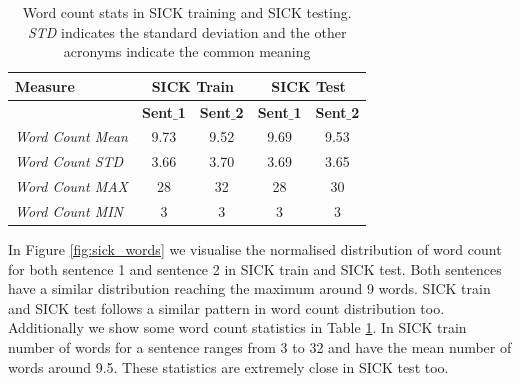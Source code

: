 \begin{enumerate}
\begin{table}
	\centering
	\begin{tabular}{l|cc|cc}
		\hline
		Measure   & \multicolumn{2}{c|}{SICK Train} & \multicolumn{2}{c}{SICK Test} \\
		\hline
		\multicolumn{1}{l|}{} & \textbf{Sent$\_$1} & \textbf{Sent$\_$2} & \textbf{Sent$\_$1} & \textbf{Sent$\_$2} \\
		\textit{Word Count Mean} & 9.73 & 9.52 & 9.69 & 9.53  \\
		\textit{Word Count STD} & 3.66 & 3.70 & 3.69 & 3.65  \\
		\textit{Word Count MAX} & 28 & 32 & 28 & 30  \\
		\textit{Word Count MIN} & 3 & 3 & 3 & 3  \\
		\hline
	\end{tabular}
	\caption[Word count stats in SICK]{Word count stats in SICK training and SICK testing. \textit{STD} indicates the standard deviation and the other acronyms indicate the common meaning }
	\label{table:sick_sts}
\end{table}

In Figure \ref{fig:sick_words} we visualise the normalised distribution of word count for both sentence 1 and sentence 2 in SICK train and SICK test. Both sentences have a similar distribution reaching the maximum around 9 words. SICK train and SICK test follows a similar pattern in word count distribution too. Additionally we show some word count statistics in Table \ref{table:sick_sts}. In SICK train number of words for a sentence ranges from 3 to 32 and have the mean number of words around 9.5. These statistics are extremely close in SICK test too. 



\end{enumerate}
